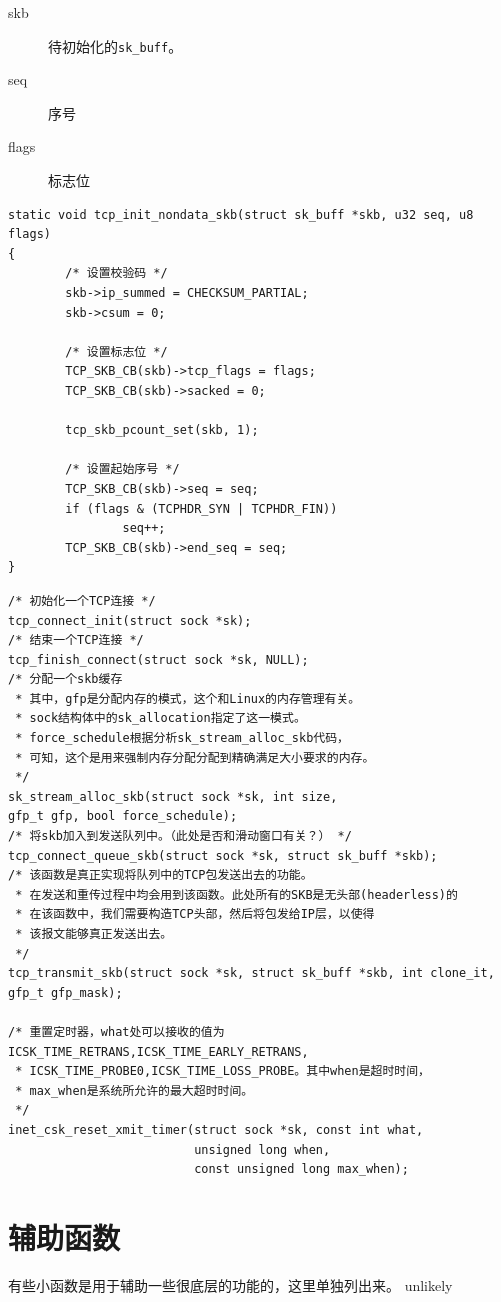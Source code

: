 \documentclass[11pt, a4paper,oneside]{book}
\theoremstyle{ocrenumbox}
\theoremstyle{purplenumbox}
\theoremstyle{blackbox}
\begin{document}
\begin{description}
  \item[skb] 待初始化的\texttt{sk_buff}。
  \item[seq] 序号
  \item[flags] 标志位
\end{description}

\begin{verbatim}
static void tcp_init_nondata_skb(struct sk_buff *skb, u32 seq, u8 flags)
{
        /* 设置校验码 */
        skb->ip_summed = CHECKSUM_PARTIAL;
        skb->csum = 0;

        /* 设置标志位 */
        TCP_SKB_CB(skb)->tcp_flags = flags;
        TCP_SKB_CB(skb)->sacked = 0;

        tcp_skb_pcount_set(skb, 1);

        /* 设置起始序号 */
        TCP_SKB_CB(skb)->seq = seq;
        if (flags & (TCPHDR_SYN | TCPHDR_FIN))
                seq++;
        TCP_SKB_CB(skb)->end_seq = seq;
}
\end{verbatim}

\begin{verbatim}
/* 初始化一个TCP连接 */
tcp_connect_init(struct sock *sk);
/* 结束一个TCP连接 */
tcp_finish_connect(struct sock *sk, NULL);
/* 分配一个skb缓存
 * 其中，gfp是分配内存的模式，这个和Linux的内存管理有关。
 * sock结构体中的sk_allocation指定了这一模式。
 * force_schedule根据分析sk_stream_alloc_skb代码，
 * 可知，这个是用来强制内存分配分配到精确满足大小要求的内存。
 */
sk_stream_alloc_skb(struct sock *sk, int size,
gfp_t gfp, bool force_schedule);
/* 将skb加入到发送队列中。（此处是否和滑动窗口有关？） */ 
tcp_connect_queue_skb(struct sock *sk, struct sk_buff *skb);
/* 该函数是真正实现将队列中的TCP包发送出去的功能。
 * 在发送和重传过程中均会用到该函数。此处所有的SKB是无头部(headerless)的
 * 在该函数中，我们需要构造TCP头部，然后将包发给IP层，以使得
 * 该报文能够真正发送出去。
 */
tcp_transmit_skb(struct sock *sk, struct sk_buff *skb, int clone_it,
gfp_t gfp_mask);

/* 重置定时器，what处可以接收的值为ICSK_TIME_RETRANS,ICSK_TIME_EARLY_RETRANS,
 * ICSK_TIME_PROBE0,ICSK_TIME_LOSS_PROBE。其中when是超时时间，
 * max_when是系统所允许的最大超时时间。
 */
inet_csk_reset_xmit_timer(struct sock *sk, const int what,
                          unsigned long when,
                          const unsigned long max_when);
\end{verbatim}

\section{辅助函数}
有些小函数是用于辅助一些很底层的功能的，这里单独列出来。
				unlikely
\end{document}

